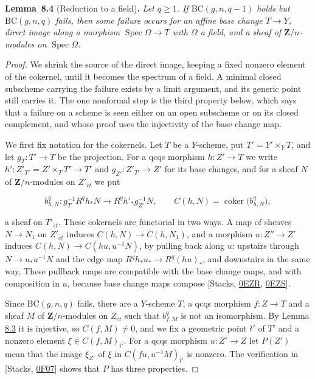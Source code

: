 \documentclass[11pt]{article}
\newenvironment{bpstatement}[2]{\par\addvspace{0.6\baselineskip}\noindent\textbf{#1}#2\textbf{.}\enspace\ignorespaces}
  {\par\addvspace{0.4\baselineskip}}
\newenvironment{bpstatementit}[2]{\begin{bpstatement}{#1}{#2}\itshape\ignorespaces}{\end{bpstatement}}
\begin{document}
\label{bp20}%
\begin{bpstatementit}{Lemma~8.4}{ (Reduction to a field)}
Let \(q\geq1\). If \(\mathrm{BC}(g,n,q-1)\) holds but \(\mathrm{BC}(g,n,q)\) fails, then some failure occurs for an affine base change \(T\to Y\), direct image along a morphism \(\operatorname{Spec}\Omega\to T\) with \(\Omega\) a field, and a sheaf of \(\mathbf Z/n\)-modules on \(\operatorname{Spec}\Omega\).
\end{bpstatementit}

\begin{proof}[{Proof}]\label{bp21}%
We shrink the source of the direct image, keeping a fixed nonzero element of the cokernel, until it becomes the spectrum of a field. A minimal closed subscheme carrying the failure exists by a limit argument, and its generic point still carries it. The one nonformal step is the third property below, which says that a failure on a scheme is seen either on an open subscheme or on its closed complement, and whose proof uses the injectivity of the base change map.

We first fix notation for the cokernels. Let \(T\) be a \(Y\)-scheme, put \(T'=Y'\times_YT\), and let \(g_T:T'\to T\) be the projection. For a qcqs morphism \(h:Z'\to T\) we write \(h':Z'_{T'}=Z'\times_TT'\to T'\) and \(g_{Z'}:Z'_{T'}\to Z'\) for its base changes, and for a sheaf \(N\) of \(\mathbf Z/n\)-modules on \(Z'_{\acute{e}t}\) we put

\[
b^q_{h,N}:g_T^{-1}R^qh_*N\longrightarrow R^qh'_*g_{Z'}^{-1}N,
\qquad
C(h,N)=\operatorname{coker}\bigl(b^q_{h,N}\bigr),
\]

a sheaf on \(T'_{\acute{e}t}\). These cokernels are functorial in two ways. A map of sheaves \(N\to N_1\) on \(Z'_{\acute{e}t}\) induces \(C(h,N)\to C(h,N_1)\), and a morphism \(u:Z''\to Z'\) induces \(C(h,N)\to C(hu,u^{-1}N)\), by pulling back along \(u\): upstairs through \(N\to u_*u^{-1}N\) and the edge map \(R^qh_*u_*\to R^q(hu)_*\), and downstairs in the same way. These pullback maps are compatible with the base change maps, and with composition in \(u\), because base change maps compose [Stacks, \href{https://stacks.math.columbia.edu/tag/0EZR}{0EZR}, \href{https://stacks.math.columbia.edu/tag/0EZS}{0EZS}].

Since \(\mathrm{BC}(g,n,q)\) fails, there are a \(Y\)-scheme \(T\), a qcqs morphism \(f:Z\to T\) and a sheaf \(M\) of \(\mathbf Z/n\)-modules on \(Z_{\acute{e}t}\) such that \(b^q_{f,M}\) is not an isomorphism. By Lemma \hyperref[bp17]{8.3} it is injective, so \(C(f,M)\neq0\), and we fix a geometric point \(\bar t'\) of \(T'\) and a nonzero element \(\xi\in C(f,M)_{\bar t'}\). For a qcqs morphism \(u:Z'\to Z\) let \(P(Z')\) mean that the image \(\xi_{Z'}\) of \(\xi\) in \(C(fu,u^{-1}M)_{\bar t'}\) is nonzero. The verification in [Stacks, \href{https://stacks.math.columbia.edu/tag/0F07}{0F07}] shows that \(P\) has three properties.


\end{proof}
\end{document}
